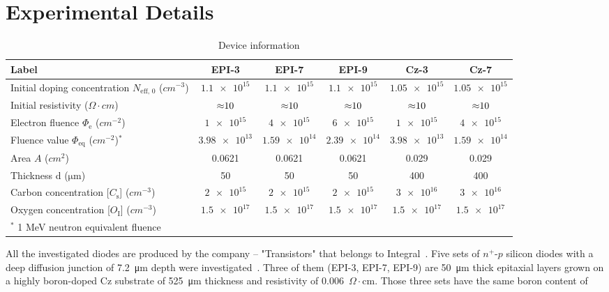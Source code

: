 \documentclass[final, 5p, times]{elsarticle}
\begin{document}
\section{Experimental Details}
\begin{table}[htbp]
\centering
\caption{Device information}
  \begin{tabular}{@{}lccccc@{}}
   \toprule
   Label & EPI-3 & EPI-7 & EPI-9 & Cz-3 & Cz-7\\
  \midrule
  Initial doping concentration $N_\text{eff, 0}$ ($\si{cm^{-3}}$) &  $\num{1.1e15}$ & $\num{1.1e15}$ & 
   $\num{1.1e15}$ & $\num{1.05e15}$ & $\num{1.05e15}$\\
  Initial resistivity ($\si{\Omega\cdot cm}$) & $\num{\approx10}$ & $\num{\approx10}$ & $\num{\approx10}$
   & $\num{\approx10}$ & $\num{\approx10}$\\
  Electron fluence $\Phi_\text{e}$ ($\si{cm^{-2}}$) & $\num{1e15}$ & $\num{4e15}$ & $\num{6e15}$ & 
  $\num{1e15}$ & $\num{4e15}$\\
  Fluence value $\Phi_\text{eq}$ ($\si{cm^{-2}}$)$^*$ & $\num{3.98e13}$ & $\num{1.59e14}$ & $\num{2.39e14}$ 
  & $\num{3.98e13}$ & $\num{1.59e14}$\\
  Area $A$ ($\si{cm^{2}}$) &  0.0621 & 0.0621 & 0.0621 & 0.029 & 0.029\\
  Thickness d ($\si{\micro\meter}$) & 50 & 50 & 50 & 400 & 400\\
  Carbon concentration [$C_\text{s}$] ($\si{cm^{-3}}$) & $\num{2e15}$ & $\num{2e15}$ & $\num{2e15}$ & $\num{3e16}$ & $\num{3e16}$\\
  Oxygen concentration [$O_\text{I}$] ($\si{cm^{-3}}$) & $\num{1.5e17}$ & $\num{1.5e17}$ & $\num{1.5e17}$ & $\num{1.5e17}$ & $\num{1.5e17}$\\
  \bottomrule
  
 $^*$ 1 MeV neutron equivalent fluence
  
  \end{tabular}

\label{tab:table1}
\end{table}
All the investigated diodes are produced by the company -- "Transistors" that belongs to Integral~\cite{b11}. Five sets of $n^+$-$p$ silicon diodes with a deep diffusion junction of
\SI{7.2}{\micro\meter} depth were investigated~\cite{b12}. Three of them (EPI-3, EPI-7, EPI-9) are \SI{50}{\micro\meter} thick epitaxial layers grown on a highly
boron-doped Cz substrate of \SI{525}{\micro\meter} thickness and resistivity of
0.006~$\Omega\cdot$cm. Those three sets have the same boron content of
\end{document}
